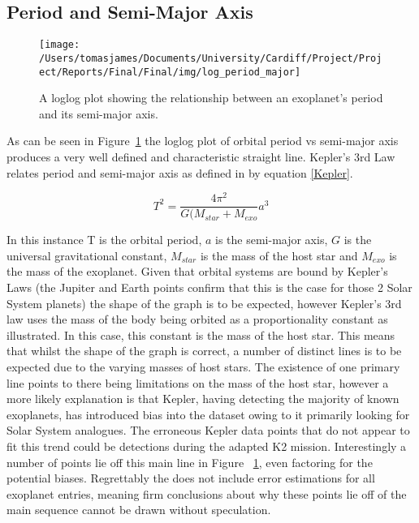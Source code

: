 \documentclass{report}
\begin{document}
\subsection*{Period and Semi-Major Axis}
\begin{figure}[H]
\centering
    \texttt{[image: /Users/tomasjames/Documents/University/Cardiff/Project/Project/Reports/Final/Final/img/log\_period\_major]}
\caption{A loglog plot showing the relationship between an exoplanet's period and its semi-major axis.}\label{log_period_major}
\end{figure}

As can be seen in Figure~\ref{log_period_major} the loglog plot of orbital period vs semi-major axis produces a very well defined and characteristic straight line. Kepler's 3rd Law relates period and semi-major axis as defined in \textcite{haswell} by equation \ref{Kepler}.

\begin{equation} \label{Kepler}
    T^{2} = \frac{4\pi^2}{G(M_{star}+M_{exo}} a^{3} 
\end{equation}

In this instance T is the orbital period, $a$ is the semi-major axis, $G$ is the universal gravitational constant, $M_{star}$ is the mass of the host star and $M_{exo}$ is the mass of the exoplanet. Given that orbital systems are bound by Kepler's Laws (the Jupiter and Earth points confirm that this is the case for those 2 Solar System planets) the shape of the graph is to be expected, however Kepler's 3rd law uses the mass of the body being orbited as a proportionality constant as illustrated. In this case, this constant is the mass of the host star. This means that whilst the shape of the graph is correct, a number of distinct lines is to be expected due to the varying masses of host stars. The existence of one primary line points to there being limitations on the mass of the host star, however a more likely explanation is that Kepler, having detecting the majority of known exoplanets, has introduced bias into the dataset owing to it primarily looking for Solar System analogues. The erroneous Kepler data points that do not appear to fit this trend could be detections during the adapted K2 mission. Interestingly a number of points lie off this main line in Figure ~\ref{log_period_major}, even factoring for the potential biases. Regrettably the \textcite{exo} does not include error estimations for all exoplanet entries, meaning firm conclusions about why these points lie off of the main sequence cannot be drawn without speculation.
\end{document}
